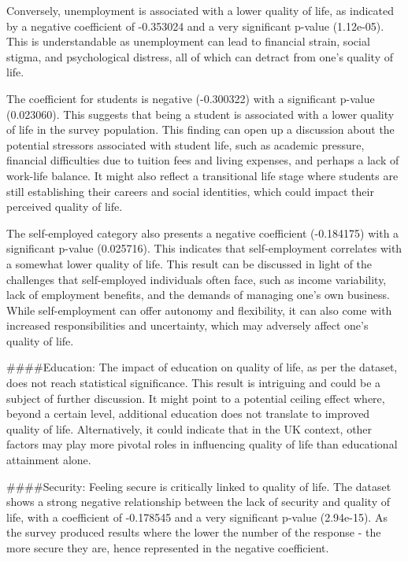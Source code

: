 \documentclass[
]{article}
\begin{document}
Conversely, unemployment is associated with a lower quality of life, as
indicated by a negative coefficient of -0.353024 and a very significant
p-value (1.12e-05). This is understandable as unemployment can lead to
financial strain, social stigma, and psychological distress, all of
which can detract from one's quality of life.

The coefficient for students is negative (-0.300322) with a significant
p-value (0.023060). This suggests that being a student is associated
with a lower quality of life in the survey population. This finding can
open up a discussion about the potential stressors associated with
student life, such as academic pressure, financial difficulties due to
tuition fees and living expenses, and perhaps a lack of work-life
balance. It might also reflect a transitional life stage where students
are still establishing their careers and social identities, which could
impact their perceived quality of life.

The self-employed category also presents a negative coefficient
(-0.184175) with a significant p-value (0.025716). This indicates that
self-employment correlates with a somewhat lower quality of life. This
result can be discussed in light of the challenges that self-employed
individuals often face, such as income variability, lack of employment
benefits, and the demands of managing one's own business. While
self-employment can offer autonomy and flexibility, it can also come
with increased responsibilities and uncertainty, which may adversely
affect one's quality of life.

\#\#\#\#Education: The impact of education on quality of life, as per
the dataset, does not reach statistical significance. This result is
intriguing and could be a subject of further discussion. It might point
to a potential ceiling effect where, beyond a certain level, additional
education does not translate to improved quality of life. Alternatively,
it could indicate that in the UK context, other factors may play more
pivotal roles in influencing quality of life than educational attainment
alone.

\#\#\#\#Security: Feeling secure is critically linked to quality of
life. The dataset shows a strong negative relationship between the lack
of security and quality of life, with a coefficient of -0.178545 and a
very significant p-value (2.94e-15). As the survey produced results
where the lower the number of the response - the more secure they are,
hence represented in the negative coefficient.
\end{document}

